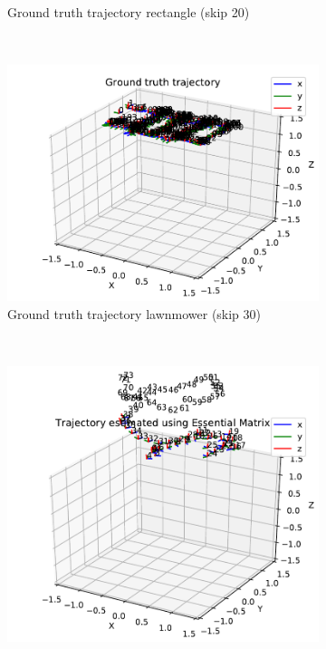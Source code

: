 \documentclass[12pt,a4paper]{article}
\begin{document}
\begin{figure}[p]
\begin{subfigure}[t]{0.3\textwidth}
        \caption{Ground truth trajectory rectangle (skip 20)}
      \end{subfigure} %
      ~
      \begin{subfigure}[t]{0.3\textwidth}
        \includegraphics[width=\textwidth]{../quad/basic-reg-saves-new-lawnmower/30/atrj_gt.pdf}
        \caption{Ground truth trajectory lawnmower (skip 30)}
      \end{subfigure} 
      \\      
      \begin{subfigure}[t]{0.3\textwidth}
        \includegraphics[width=\textwidth]{../quad/basic-reg-saves-new-circle/30/atrj_rgb.pdf}

\end{subfigure}
\end{figure}
\end{document}
